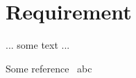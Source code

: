 \chapter{Requirement}
\label{sec:Requirement}


... some text ...

Some reference~\cite{Led2004}
abc\cite{RFC3261}


